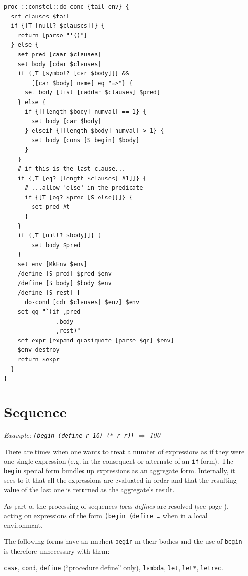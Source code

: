 \documentclass[twoside]{report}
\begin{document}
\begin{lstlisting}
proc ::constcl::do-cond {tail env} {
  set clauses $tail
  if {[T [null? $clauses]]} {
    return [parse "'()"]
  } else {
    set pred [caar $clauses]
    set body [cdar $clauses]
    if {[T [symbol? [car $body]]] &&
        [[car $body] name] eq "=>"} {
      set body [list [caddar $clauses] $pred]
    } else {
      if {[[length $body] numval] == 1} {
        set body [car $body]
      } elseif {[[length $body] numval] > 1} {
        set body [cons [S begin] $body]
      }
    }
    # if this is the last clause...
    if {[T [eq? [length $clauses] #1]]} {
      # ...allow 'else' in the predicate
      if {[T [eq? $pred [S else]]]} {
        set pred #t
      }
    }
    if {[T [null? $body]]} {
        set body $pred
    }
    set env [MkEnv $env]
    /define [S pred] $pred $env
    /define [S body] $body $env
    /define [S rest] [
      do-cond [cdr $clauses] $env] $env
    set qq "`(if ,pred
               ,body
               ,rest)"
    set expr [expand-quasiquote [parse $qq] $env]
    $env destroy
    return $expr
  }
}
\end{lstlisting}

\section{Sequence}
\label{sequence}

\emph{Example: \texttt{(begin (define r 10) (* r r))} $\Rightarrow$ 100}

There are times when one wants to treat a number of expressions as if they were one single expression (e.g. in the consequent or alternate of an \texttt{if} form). The \texttt{begin} special form bundles up expressions as an aggregate form. Internally, it sees to it that all the expressions are evaluated in order and that the resulting value of the last one is returned as the aggregate's result.

As part of the processing of sequences \emph{local defines} are resolved (see page \pageref{resolving-local-defines}), acting on expressions of the form \texttt{(begin (define \ldots } when in a local environment.

The following forms have an implicit \texttt{begin} in their bodies and the use of \texttt{begin} is therefore unnecessary with them:

\texttt{case}, \texttt{cond}, \texttt{define} (“procedure define” only), \texttt{lambda}, \texttt{let}, \texttt{let*}, \texttt{letrec}.
\end{document}
